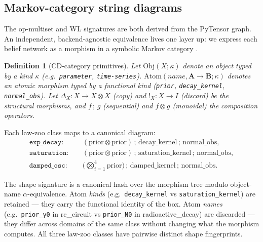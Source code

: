 \documentclass{article}
\newtheorem{definition}{Definition}
\begin{document}
\subsection{Markov-category string diagrams}
\label{sec:markov-cat}

The op-multiset and WL signatures are both derived from the
PyTensor graph. An independent, backend-agnostic equivalence lives one
layer up: we express each belief network as a morphism in a symbolic
Markov category \citep{fritz2020synthetic, perrone2024catinfogeom}.

\begin{definition}[CD-category primitives]\label{def:cd-primitives}
Let
$\mathrm{Obj}(X; \kappa)$ denote an object typed by a \emph{kind}
$\kappa$ (e.g.\ \texttt{parameter}, \texttt{time-series}).
$\mathrm{Atom}(\mathit{name}, \mathbf{A} \to \mathbf{B}; \kappa)$
denotes an atomic morphism typed by a functional \emph{kind} (\texttt{prior},
\texttt{decay\_kernel}, \texttt{normal\_obs}). Let $\Delta_{X}: X \to
X \otimes X$ (copy) and $!_{X}: X \to I$ (discard) be the structural
morphisms, and $f \,;\, g$ (sequential) and $f \otimes g$ (monoidal)
the composition operators.
\end{definition}

Each law-zoo class maps to a canonical diagram:
\begin{equation}
\begin{aligned}
\mathtt{exp\_decay}: \quad &
  (\mathrm{prior} \otimes \mathrm{prior}) \,;\, \mathrm{decay\_kernel} \,;\, \mathrm{normal\_obs},\\
\mathtt{saturation}: \quad &
  (\mathrm{prior} \otimes \mathrm{prior}) \,;\, \mathrm{saturation\_kernel} \,;\, \mathrm{normal\_obs},\\
\mathtt{damped\_osc}: \quad &
  \Big(\bigotimes_{i=1}^{4} \mathrm{prior}\Big) \,;\, \mathrm{damped\_kernel} \,;\, \mathrm{normal\_obs}.
\end{aligned}
\end{equation}

The shape signature is a canonical hash over the morphism tree modulo
object-name $\alpha$-equivalence. Atom \emph{kinds} (e.g.\
\texttt{decay\_kernel} vs \texttt{saturation\_kernel}) are retained
--- they carry the functional identity of the box. Atom \emph{names} (e.g.\
\texttt{prior\_y0} in rc\_circuit vs \texttt{prior\_N0} in
radioactive\_decay) are discarded --- they differ across domains of
the same class without changing what the morphism computes. All three
law-zoo classes have pairwise distinct shape fingerprints.
\end{document}
